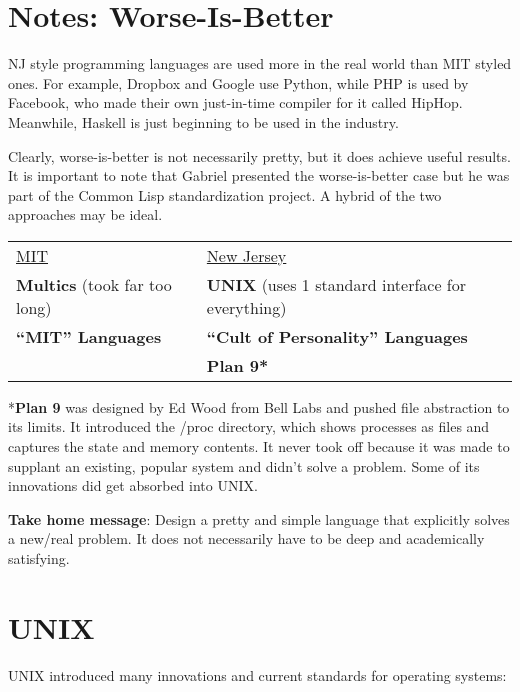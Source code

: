 \documentclass[twoside]{article}
\begin{document}
\section{Notes: Worse-Is-Better}
NJ style programming languages are used more in the real world than MIT styled
ones. For example, Dropbox and Google use Python, while PHP is used by Facebook,
who made their own just-in-time compiler for it called HipHop. Meanwhile,
Haskell is just beginning to be used in the industry.

Clearly, worse-is-better is not necessarily pretty, but it does achieve
useful results. It is important to note that Gabriel presented the
worse-is-better case but he was part of the Common Lisp standardization project.
A hybrid of the two approaches may be ideal.

\begin{table}[h]
\centering
\begin{tabular}{ll}
{\Large \underline{MIT}}             & {\Large \underline{New Jersey}}\\
\textbf{Multics} (took far too long) & \textbf{UNIX} (uses 1 standard interface for everything)\\
\textbf{``MIT'' Languages}           & \textbf{``Cult of Personality'' Languages} \\
                                     & \textbf{Plan 9*} \\
\end{tabular}
\end{table}

\begin{footnotesize}
*\textbf{Plan 9} was designed by Ed Wood from Bell Labs and pushed file
abstraction to its limits. It introduced the /proc directory, which shows
processes as files and captures the state and memory contents. It never took off
because it was made to supplant an existing, popular system and didn't solve a
problem. Some of its innovations did get absorbed into UNIX.\\
\end{footnotesize}

\textbf{Take home message}: Design a pretty and simple language that explicitly
solves a new/real problem. It does not necessarily have to be deep and
academically satisfying. 

\section{UNIX}

UNIX introduced many innovations and current standards for operating systems:
\end{document}
